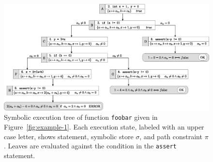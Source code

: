

\begin{figure}[t]
  \centering
  \includegraphics[width=1.0\columnwidth]{images/execution-tree.eps} 
  \caption{Symbolic execution tree of function {\tt foobar} given in Figure~\ref{fig:example-1}. Each execution state, labeled with an upper case letter, shows statement, symbolic store $\sigma$, and path constraint $\pi$. Leaves are evaluated against the condition in the {\tt assert} statement. }
  \label{fig:example-symbolic-execution}
\end{figure}

